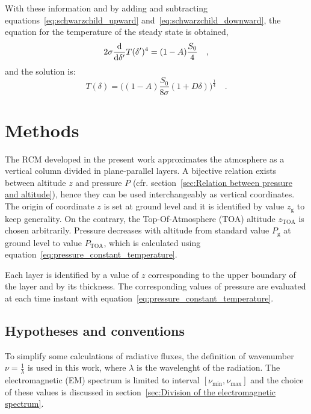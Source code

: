\documentclass[a4paper,10pt,twocolumn,\classoptions]{article}
\newcommand{\zTOA}{z_\text{TOA}}
\newcommand{\PTOA}{P_\text{TOA}}
\begin{document}
With these information and by adding and subtracting equations~\eqref{eq:schwarzchild_upward} and~\ref{eq:schwarzchild_downward}, the equation for the temperature of the steady state is obtained,
\begin{equation}
  \label{eq:temperature_radiative_equilibrium}
  2 \sigma \odv*{T(\delta')^4}{\delta'} = (1 - A) \frac{S_0}{4}
  \quad ,
\end{equation}
and the solution is:
\begin{equation}
  \label{eq:temperature_radiative_equilibrium_solution}
  T(\delta) = \bigg( (1 - A) \frac{S_0}{8 \sigma} (1 + D \delta) \bigg)^\frac{1}{4}
  \quad .
\end{equation}



\section{Methods}
\label{sec:Methods}
The RCM developed in the present work approximates the atmosphere as a vertical column divided in plane-parallel layers. 
A bijective relation exists between altitude $z$ and pressure $P$ (cfr. section~\ref{sec:Relation between pressure and altitude}), hence they can be used interchangeably as vertical coordinates. The origin of coordinate $z$ is set at ground level and it is identified by value $z_\text{g}$ to keep generality. On the contrary, the Top-Of-Atmosphere (TOA) altitude $\zTOA$ is chosen arbitrarily. Pressure decreases with altitude from standard value $P_\text{g}$ at ground level to value $\PTOA$, which is calculated using equation~\eqref{eq:pressure_constant_temperature}. %

Each layer is identified by a value of $z$ corresponding to the upper boundary of the layer and by its thickness. The corresponding values of pressure are evaluated at each time instant with equation~\eqref{eq:pressure_constant_temperature}.



\subsection{Hypotheses and conventions}
\label{sec:Hypotheses and conventions}
To simplify some calculations of radiative fluxes,
the definition of wavenumber $\nu = \frac{1}{\lambda}$ is used in this work, where $\lambda$ is the wavelenght of the radiation. The electromagnetic (EM) spectrum is limited to interval $[\nu_\text{min}, \nu_\text{max}]$ and the choice of these values is discussed in section~\ref{sec:Division of the electromagnetic spectrum}.
\end{document}
